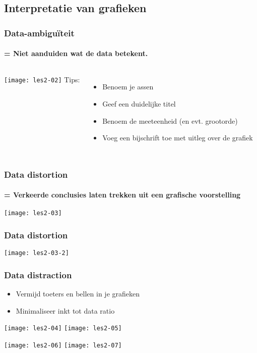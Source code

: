\documentclass[aspectratio=169]{beamer}
\begin{document}
\subsection{Interpretatie van grafieken}

\begin{frame}
  \frametitle{Data-ambiguïteit}
  \framesubtitle{= Niet aanduiden wat de data betekent.}

  \begin{columns}
    \texttt{[image: les2-02]}
    Tips:
    \begin{itemize}
      \item Benoem je assen
      \item Geef een duidelijke titel
      \item Benoem de meeteenheid (en evt. grootorde)
      \item Voeg een bijschrift toe met uitleg over de grafiek
    \end{itemize}
  \end{columns}
\end{frame}

\begin{frame}
  \frametitle{Data distortion}
  \framesubtitle{= Verkeerde conclusies laten trekken uit een grafische voorstelling}

  \bigskip

  \begin{center}
    \texttt{[image: les2-03]}
  \end{center}
\end{frame}

\begin{frame}
  \frametitle{Data distortion}

  \begin{center}
    \texttt{[image: les2-03-2]}
  \end{center}
\end{frame}

\begin{frame}
  \frametitle{Data distraction}

  \begin{itemize}
    \item Vermijd toeters en bellen in je grafieken
    \item Minimaliseer inkt tot data ratio
  \end{itemize}

  \centering
  \texttt{[image: les2-04]}
  \texttt{[image: les2-05]}

  \texttt{[image: les2-06]}
  \texttt{[image: les2-07]}
\end{frame}
\end{document}
